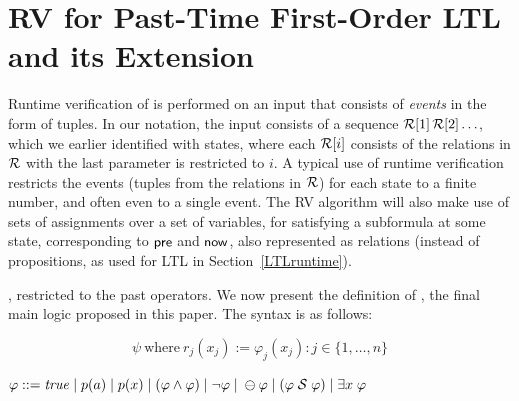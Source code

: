\section{RV for Past-Time
First-Order  LTL and its Extension}
\label{EPLTLRV}

Runtime verification of \FLTL{} is performed on an
input that consists of {\em events} in the form of
tuples. In our notation, the input
consists of a sequence ${\cal R}[1] \, {\cal R}[2]  \ldots$,
which we earlier identified with states, where each
${\cal R}[i]$ consists of the relations in
${\cal R}$ with
the last parameter is restricted to  $i$. A typical use
of runtime verification restricts the
events (tuples from the relations in ${\cal R}$) for
each state to a finite number, and often even to a single event.
The RV algorithm will also make
use of sets of assignments over a set of variables, for satisfying a subformula at
some state, corresponding to $\mathsf{pre}$ and $\mathsf{now}$, also represented as relations
(instead of propositions, as used for LTL in Section~\ref{LTLruntime}).





\iffalse
, restricted to the past operators. We now present the definition of \EPFLTL{}, the final main logic proposed in this paper. 
The syntax is as follows:


\[ 
\psi \mathrm{\ where\ } r_j ( x_j) := 
\varphi_j (x_j) : j \in \{ 1 , \ldots , n \}
\]
\begin{center}
$\varphi ::= \mathit{true}  \; | \;
    p ( a ) \; | \;
    p ( x ) \; | \;
    ( \varphi \wedge \varphi ) \;  |   \;
   \neg \varphi \; | \;
    \ominus \varphi \; | \;
    ( \varphi  \; {\cal S}  \; \varphi ) \; | \;
    \exists x \; \varphi$
\end{center}

